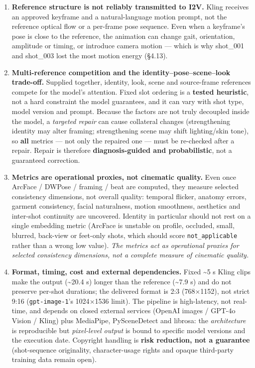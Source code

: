 \documentclass[10pt,twocolumn,letterpaper]{article}
\begin{document}
\begin{enumerate}[leftmargin=1.4em,itemsep=2pt,topsep=2pt]
\item \textbf{Reference structure is not reliably transmitted to I2V.} Kling receives an approved keyframe and a natural-language motion prompt, not the reference optical flow or a per-frame pose sequence. Even when a keyframe's pose is close to the reference, the animation can change gait, orientation, amplitude or timing, or introduce camera motion --- which is why shot\_001 and shot\_003 lost the most motion energy (\S{}4.13).

\item \textbf{Multi-reference competition and the identity--pose--scene--look trade-off.} Supplied together, identity, look, scene and source-frame references compete for the model's attention. Fixed slot ordering is a \textbf{tested heuristic}, not a hard constraint the model guarantees, and it can vary with shot type, model version and prompt. Because the factors are not truly decoupled inside the model, a \emph{targeted repair} can cause collateral changes (strengthening identity may alter framing; strengthening scene may shift lighting/skin tone), so \textbf{all} metrics --- not only the repaired one --- must be re-checked after a repair. Repair is therefore \textbf{diagnosis-guided and probabilistic}, not a guaranteed correction.

\item \textbf{Metrics are operational proxies, not cinematic quality.} Even once ArcFace / DWPose / framing / beat are computed, they measure selected consistency dimensions, not overall quality: temporal flicker, anatomy errors, garment consistency, facial naturalness, motion smoothness, aesthetics and inter-shot continuity are uncovered. Identity in particular should not rest on a single embedding metric (ArcFace is unstable on profile, occluded, small, blurred, back-view or feet-only shots, which should score \texttt{not\_applicable} rather than a wrong low value). \emph{The metrics act as operational proxies for selected consistency dimensions, not a complete measure of cinematic quality.}

\item \textbf{Format, timing, cost and external dependencies.} Fixed \textasciitilde{}5 s Kling clips make the output (\textasciitilde{}20.4 s) longer than the reference (\textasciitilde{}7.9 s) and do not preserve per-shot durations; the delivered format is 2:3 (768$\times$1152), not strict 9:16 (\texttt{gpt-image-1}'s 1024$\times$1536 limit). The pipeline is high-latency, not real-time, and depends on closed external services (OpenAI images / GPT-4o Vision / Kling) plus MediaPipe, PySceneDetect and librosa: the \emph{architecture} is reproducible but \emph{pixel-level output} is bound to specific model versions and the execution date. Copyright handling is \textbf{risk reduction, not a guarantee} (shot-sequence originality, character-usage rights and opaque third-party training data remain open).

\end{enumerate}
\end{document}
